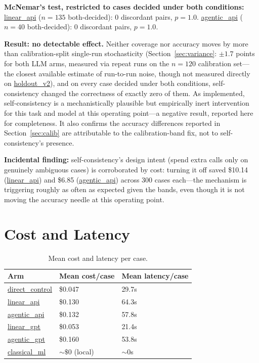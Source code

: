 \documentclass[]{ieeeaccess}
\newcommand{\code}[1]{\url{#1}}
\begin{document}
\textbf{McNemar's test, restricted to cases decided under both
conditions:} \code{linear_api} ($n=135$ both-decided): 0 discordant
pairs, $p=1.0$. \code{agentic_api} ($n=40$ both-decided): 0 discordant
pairs, $p=1.0$.

\textbf{Result: no detectable effect.} Neither coverage nor accuracy
moves by more than calibration-split single-run stochasticity (Section~\ref{sec:variance}: $\pm 1.7$ points for both LLM arms, measured via repeat runs on the
$n=120$ calibration set---the closest available estimate of run-to-run
noise, though not measured directly on \code{holdout_v2}), and on every
case decided under both conditions, self-consistency changed the
correctness of exactly zero of them. As implemented, self-consistency is
a mechanistically plausible but empirically inert intervention for this
task and model at this operating point---a negative result, reported
here for completeness. It also confirms the accuracy
differences reported in Section~\ref{sec:calib} are attributable to the
calibration-band fix, not to self-consistency's presence.

\textbf{Incidental finding:} self-consistency's design intent (spend
extra calls only on genuinely ambiguous cases) is corroborated by cost:
turning it off saved \$10.14 (\code{linear_api}) and \$6.85
(\code{agentic_api}) across 300 cases each---the mechanism is
triggering roughly as often as expected given the bands, even though it
is not moving the accuracy needle at this operating point.

\section{Cost and Latency}\label{sec:cost}

\begin{table}[H]
\centering
\caption{Mean cost and latency per case.}\label{tab:cost}
\begin{tabularx}{\columnwidth}{@{}lYY@{}}
\toprule
\textbf{Arm} & \textbf{Mean cost/case} & \textbf{Mean latency/case} \\
\midrule
\code{direct_control} & \$0.047 & 29.7s \\
\code{linear_api} & \$0.130 & 64.3s \\
\code{agentic_api} & \$0.132 & 57.8s \\
\code{linear_gpt} & \$0.053 & 21.4s \\
\code{agentic_gpt} & \$0.160 & 53.8s \\
\code{classical_ml} & ${\sim}\$0$ (local) & ${\sim}0$s \\
\bottomrule
\end{tabularx}
\end{table}
\end{document}
